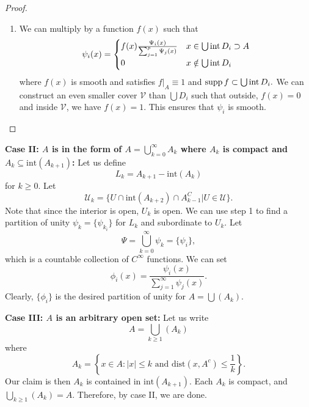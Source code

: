 \documentclass{article}
\numberwithin{equation}{section}
\begin{document}
\begin{proof}
\begin{enumerate}
        \item We can multiply by a function $f(x)$ such that 
        \begin{equation}
            \psi_i(x) = \begin{cases}
                f(x) \frac{\Psi_i(x)}{\sum_{j=1}^{p} \Psi_j(x)} & x \in \bigcup \operatorname{int} D_i \supset A \\ 
                0 & x \notin \bigcup \operatorname{int} D_i
            \end{cases}
        \end{equation} 
        where $f(x)$ is smooth and satisfies $f|_A \equiv 1$ and $\operatorname{supp} f \subset \bigcup \operatorname{int} D_i.$ We can construct an even smaller cover $\mathcal{V}$ than $\bigcup D_i$ such that outside, $f(x) = 0$ and inside $\mathcal{V}$, we have $f(x)=1.$ This ensures that $\psi_i$ is smooth.
    \end{enumerate}
\end{proof}
\textbf{Case II: $A$ is in the form of $A = \bigcup_{k=0}^{\infty} A_k$ where $A_k$ is compact and $A_k \subseteq \text{int}(A_{k+1})$:} Let us define
\begin{equation}
    L_k = A_{k+1} - \text{int}(A_k)
\end{equation}
for $k \ge 0.$ Let
\begin{equation}
    \mathcal{U}_k = \{U \cap \text{int}(A_{k+2}) \cap A_{k-1}^C | U \in \mathcal{U}\}.
\end{equation}
Note that since the interior is open, $U_k$ is open. We can use step 1 to find a partition of unity $\psi_k = \{\psi_{k_i}\}$ for $L_k$ and subordinate to $U_k$. Let
\begin{equation}
    \Psi = \bigcup_{k=0}^{\infty} \psi_k = \{\psi_i\},
\end{equation}
which is a countable collection of $C^\infty$ functions. We can set 
\begin{equation}
    \phi_i(x) = \frac{\psi_i(x)}{\sum_{j=1}^{\infty} \psi_j(x)}.
\end{equation}
Clearly, $\{\phi_i\}$ is the desired partition of unity for $A = \bigcup(A_k).$

\textbf{Case III: $A$ is an arbitrary open set:} Let us write 
\begin{equation}
    A = \bigcup_{k \ge 1}(A_k)
\end{equation}
where 
\begin{equation}
    A_k = \left\{x\in A: |x| \le k \text{ and } \text{dist}(x,A^c) \le \frac{1}{k}\right\}.
\end{equation}
Our claim is then $A_k$ is contained in $\text{int}(A_{k+1}).$ Each $A_k$ is compact, and $\bigcup_{k \ge 1}(A_k) = A.$ Therefore, by case II, we are done.
\end{document}
